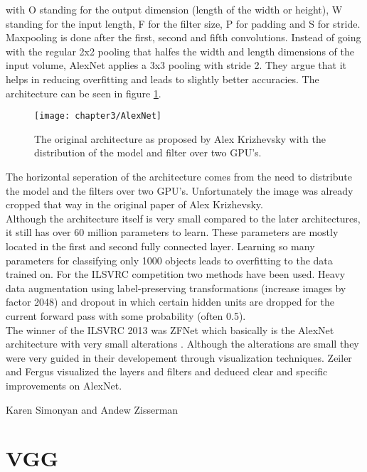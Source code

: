 with O standing for the output dimension (length of the width or height), W standing for the input length, F for the filter size, P for padding and S for stride. Maxpooling is done after the first, second and fifth convolutions. Instead of going with the regular 2x2 pooling that halfes the width and length dimensions of the input volume, AlexNet applies a 3x3 pooling with stride 2. They argue that it helps in reducing overfitting and leads to slightly better accuracies. The architecture can be seen in figure \ref{fig:AlexNet}. \\

\begin{figure}[H]
  \centering
  \caption{The original architecture as proposed by Alex Krizhevsky with the distribution of the model and filter over two GPU's. \cite{krizhevsky2012imagenet}}
  \texttt{[image: chapter3/AlexNet]}
  \label{fig:AlexNet}
\end{figure}

The horizontal seperation of the architecture comes from the need to distribute the model and the filters over two GPU's. Unfortunately the image was already cropped that way in the original paper of Alex Krizhevsky. \\

Although the architecture itself is very small compared to the later architectures, it still has over 60 million parameters to learn. These parameters are mostly located in the first and second fully connected layer. Learning so many parameters for classifying only 1000 objects leads to overfitting to the data trained on. For the ILSVRC competition two methods have been used. Heavy data augmentation using label-preserving transformations (increase images by factor 2048) and dropout in which certain hidden units are dropped for the current forward pass with some probability (often 0.5). \\

The winner of the ILSVRC 2013 was ZFNet which basically is the AlexNet architecture with very small alterations \cite{zeiler2014visualizing}. Although the alterations are small they were very guided in their developement through visualization techniques. Zeiler and Fergus visualized the layers and filters and deduced clear and specific improvements on AlexNet.

Karen Simonyan and Andew Zisserman

\section{VGG}

